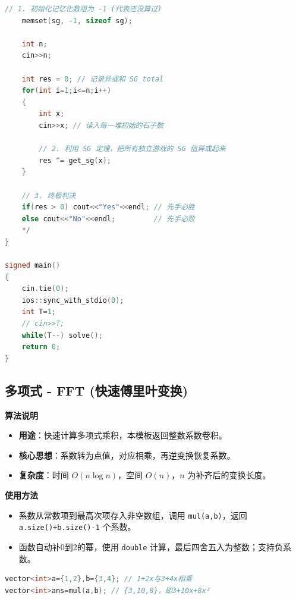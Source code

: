 \documentclass[10pt,landscape,a4paper]{article}
\begin{document}
\begin{multicols*}{3}
\begin{lstlisting}[language=C++]
    // 1. 初始化记忆化数组为 -1 (代表还没算过)
    memset(sg, -1, sizeof sg);
    
    int n;
    cin>>n;
    
    int res = 0; // 记录异或和 SG_total
    for(int i=1;i<=n;i++)
    {
        int x;
        cin>>x; // 读入每一堆初始的石子数
        
        // 2. 利用 SG 定理，把所有独立游戏的 SG 值异或起来
        res ^= get_sg(x);
    }
    
    // 3. 终极判决
    if(res > 0) cout<<"Yes"<<endl; // 先手必胜
    else cout<<"No"<<endl;         // 先手必败
    */
}

signed main()
{
    cin.tie(0);
    ios::sync_with_stdio(0);
    int T=1;
    // cin>>T;
    while(T--) solve();
    return 0;
}
\end{lstlisting}
\subsection*{多项式 - FFT (快速傅里叶变换)}
\par\addvspace{0.7ex}\noindent\textbf{算法说明}\par\nobreak
\begin{itemize}
\item \textbf{用途}：快速计算多项式乘积，本模板返回整数系数卷积。
\item \textbf{核心思想}：系数转为点值，对应相乘，再逆变换恢复系数。
\item \textbf{复杂度}：时间 $O(n\log n)$，空间 $O(n)$，$n$ 为补齐后的变换长度。
\end{itemize}
\par\addvspace{0.7ex}\noindent\textbf{使用方法}\par\nobreak
\begin{itemize}
\item 系数从常数项到最高次项存入非空数组，调用 \texttt{m\allowbreak{}u\allowbreak{}l\allowbreak{}(\allowbreak{}a\allowbreak{},\allowbreak{}b\allowbreak{})}，返回 \texttt{a\allowbreak{}.\allowbreak{}s\allowbreak{}i\allowbreak{}z\allowbreak{}e\allowbreak{}(\allowbreak{})\allowbreak{}+\allowbreak{}b\allowbreak{}.\allowbreak{}s\allowbreak{}i\allowbreak{}z\allowbreak{}e\allowbreak{}(\allowbreak{})\allowbreak{}-\allowbreak{}1} 个系数。
\item 函数自动补0到2的幂，使用 \texttt{d\allowbreak{}o\allowbreak{}u\allowbreak{}b\allowbreak{}l\allowbreak{}e} 计算，最后四舍五入为整数；支持负系数。
\end{itemize}
\begin{lstlisting}[language=C++,numbers=none,basicstyle=\footnotesize\ttfamily]
vector<int>a={1,2},b={3,4}; // 1+2x与3+4x相乘
vector<int>ans=mul(a,b); // {3,10,8}，即3+10x+8x²
\end{lstlisting}


\end{multicols*}
\end{document}
